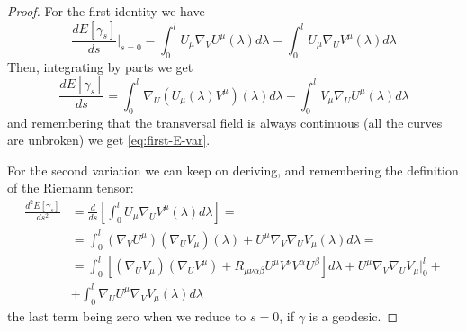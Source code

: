 \begin{proof}
	For the first identity we have
	\begin{equation*}
		\frac{dE[\gamma_s]}{ds}\Big\vert_{s = 0}  = \int_{0}^{l} U_{\mu}\nabla_VU^{\mu}(\lambda) d\lambda = \int_{0}^{l} U_{\mu}\nabla_UV^{\mu}(\lambda) d\lambda
	\end{equation*}
Then, integrating by parts we get 
\begin{equation*}
	\frac{dE[\gamma_s]}{ds} = \int_{0}^{l} \nabla_U\left(U_{\mu}(\lambda)V^{\mu}\right)(\lambda) d\lambda - \int_{0}^{l} V_{\mu}\nabla_UU^{\mu}(\lambda) d\lambda
\end{equation*}
 and remembering that the transversal field is always continuous (all the curves are unbroken) we get \eqref{eq:first-E-var}.
 
 For the second variation we can keep on deriving, and remembering the definition of the Riemann tensor:
 \begin{align*}
 	\frac{d^2E[\gamma_s]}{ds^2} &= \frac{d}{ds} \left[\int_{0}^{l} U_{\mu}\nabla_UV^{\mu}(\lambda) d\lambda\right] = \\
 	&= \int_{0}^{l} (\nabla_VU^{\mu})(\nabla_UV_{\mu})(\lambda) + U^{\mu} \nabla_V\nabla_UV_{\mu} (\lambda) d\lambda=\\
 	&= \int_{0}^{l} \left[(\nabla_UV_{\mu})(\nabla_UV^{\mu}) + R_{\mu\nu\alpha\beta}U^{\mu}V^{\nu}V^{\alpha}U^{\beta}\right] d\lambda + U^{\mu} \nabla_V\nabla_UV_{\mu} \Big\vert_0^l +\\
 	&+  \int_{0}^{l} \nabla_UU^{\mu} \nabla_VV_{\mu} (\lambda) d\lambda
 \end{align*}
	the last term being zero when we reduce to \(s = 0\), if \(\gamma\) is a geodesic.

\end{proof}

